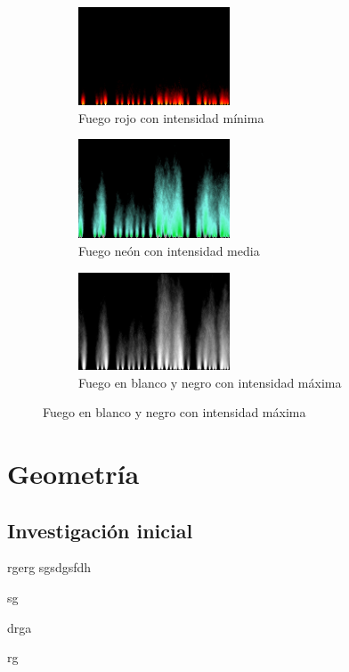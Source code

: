 \begin{figure}[h]
	\centering
	\begin{subfigure}[b]{0.3\textwidth}
		\centering
		\includegraphics[width=4.5cm]{archivos/fire_final1}
		\caption{Fuego rojo con intensidad mínima}
		\label{fig:fire_final1}
	\end{subfigure}
	\begin{subfigure}[b]{0.3\textwidth}
		\centering
		\includegraphics[width=4.5cm]{archivos/fire_final2}
		\caption{Fuego neón con intensidad media}
		\label{fig:fire_final2}
	\end{subfigure}
	\begin{subfigure}[b]{0.3\textwidth}
		\centering
		\includegraphics[width=4.5cm]{archivos/fire_final3}
		\caption{Fuego en blanco y negro con intensidad máxima}
		\label{fig:fire_final3}
	\end{subfigure}
\end{figure}

\section{Geometría}


\subsection{Investigación inicial}

rgerg
sgsdgsfdh

sg

drga

rg

